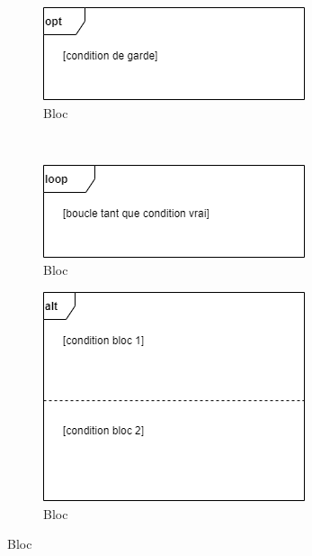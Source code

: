 \begin{figure}[H]
	\caption{Différents types de blocs de traitement dans les \acrshort{DSS}}
	\centering
	\begin{minipage}[b]{.48\textwidth}
		\begin{subfigure}[b]{.45\textwidth}
			\centering
			\includegraphics[scale=0.7]{dss-bloc-opt.png}
			\caption*{Bloc }
		\end{subfigure} \\
		\begin{subfigure}[b]{0.45\textwidth}
			\centering
			\includegraphics[scale=0.7]{dss-bloc-loop.png}
			\caption*{Bloc }
		\end{subfigure}
	\end{minipage}
	\hfill
	\begin{minipage}[b]{.48\textwidth}
		\vfill
		\begin{subfigure}[b]{0.45\textwidth}
			\centering
			\includegraphics[scale=0.7]{dss-bloc-alt.png}
			\caption*{Bloc }
		\end{subfigure}
		\vfill
	\end{minipage}
\end{figure}

